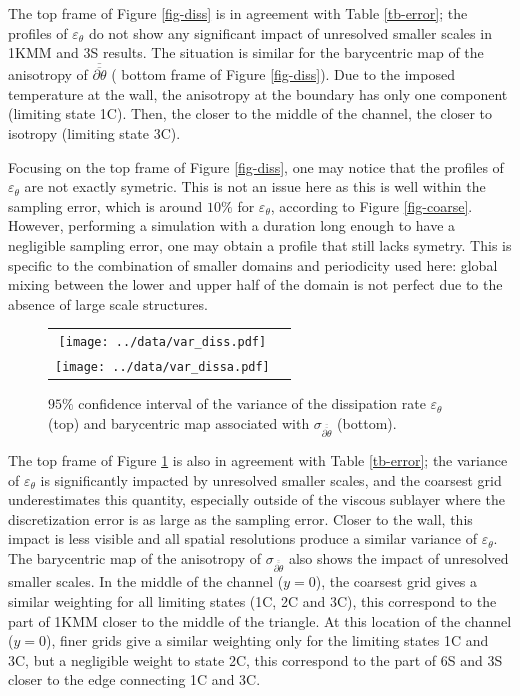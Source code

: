 \documentclass[review]{elsarticle}
\newcommand{\epst}{\varepsilon_\theta}
\begin{document}
The {\color{red} top frame of} Figure \ref{fig-diss} is in agreement with Table \ref{tb-error}; the profiles of $\epst$ do not show any significant impact of {\color{red}unresolved} smaller scales in 1KMM and 3S results. The situation is similar for the barycentric map of the anisotropy of $\overline{\overline{\partial \theta}}$ ({\color{red} bottom frame of} Figure \ref{fig-diss}). Due to the imposed temperature at the wall, the anisotropy at the boundary has only one component (limiting state 1C). Then, the closer to the middle of the channel, the closer to isotropy (limiting state 3C).

{\color{red} Focusing on the top frame of Figure \ref{fig-diss}, one may notice that the profiles of $\epst$ are not exactly symetric. This is not an issue here as this is well within the sampling error, which is around $10\%$ for $\epst$, according to Figure \ref{fig-coarse}. However, performing a simulation with a duration long enough to have a negligible sampling error, one may obtain a profile that still lacks symetry. This is specific to the combination of smaller domains and periodicity used here: global mixing between the lower and upper half of the domain is not perfect due to the absence of large scale structures.}

\begin{figure}[htbp]
\begin{center}
\begin{tabular}{cc}
\texttt{[image: ../data/var\_diss.pdf]} \\
\texttt{[image: ../data/var\_dissa.pdf]}
\end{tabular}
\end{center}
\caption{$95 \%$ confidence interval of the variance of the dissipation rate $\epst$ (top) and barycentric map associated with $\sigma_{\overline{\overline{\partial \theta}}}$ (bottom).}
\label{fig-var_diss}
\end{figure}

{\color{red} The top frame of} Figure \ref{fig-var_diss} is also in agreement with Table \ref{tb-error}; the variance of $\epst$ is significantly impacted by {\color{red}unresolved} smaller scales, and the coarsest grid underestimates this quantity, especially outside of the viscous sublayer where the discretization error is as large as the sampling error. Closer to the wall, this impact is less visible and all spatial resolutions produce a similar variance of $\epst$. The barycentric map of the anisotropy of $\sigma_{\overline{\overline{\partial \theta}}}$ also shows the impact of {\color{red}unresolved} smaller scales. In the middle of the channel {\color{red}($y=0$)}, the coarsest grid gives a similar weighting for all limiting states (1C, 2C and 3C), this correspond to the part of 1KMM closer to the middle of the triangle. At this location of the channel {\color{red}($y=0$)}, finer grids give a similar weighting only for the limiting states 1C and 3C, but a negligible weight to state 2C, this correspond to the part of 6S and 3S closer to the edge connecting 1C and 3C.
\end{document}
